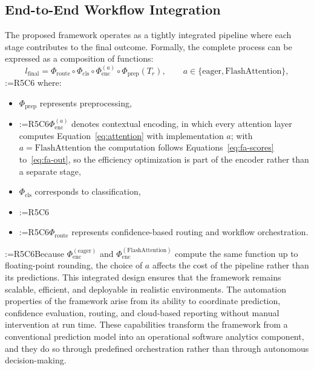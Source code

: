 \documentclass[a4paper,fleqn]{cas-sc}
\makeatletter
\newif\iftracked
\newcommand{\rv@setcolour}[1]{%
  \IfStrEq{#1}{R7C7}{\color{rvEdit}}{%
    \IfSubStr{#1}{R5}{\IfSubStr{#1}{R7}{\color{rvBoth}}{\color{rvFive}}}{\color{rvSeven}}}}
\newcommand{\rv@tag}[1]{\textsuperscript{\sffamily\bfseries\scriptsize[\StrSubstitute{#1}{,}{, }]}\,}
\newcommand{\rv@recordone}[1]{%
  \edef\rv@i{#1}%
  \ifcsdef{rv@n@\rv@i}{}{\csgdef{rv@n@\rv@i}{0}}%
  \csxdef{rv@n@\rv@i}{\the\numexpr\csuse{rv@n@\rv@i}+1\relax}%
  \begingroup\edef\@currentlabel{\rv@i}\label{rv:\rv@i:\csuse{rv@n@\rv@i}}\endgroup}
\newcommand{\rv@record}[1]{\@for\rv@id:=#1\do{\expandafter\rv@recordone\expandafter{\rv@id}}}
\DeclareRobustCommand{\rcdel}[2]{\rv@record{#1}\iftracked{\rv@setcolour{#1}\rv@tag{#1}\rv@strike{#2}}\else\unskip\fi}
\DeclareRobustCommand{\rcrep}[3]{\rv@record{#1}\iftracked{\rv@setcolour{#1}\rv@tag{#1}\rv@strike{#2} #3}\else#3\fi}
\DeclareRobustCommand{\rcm}[2]{\iftracked{\rv@setcolour{#1}#2}\else#2\fi}
\DeclareRobustCommand{\rcnote}[2]{\rv@record{#1}\iftracked{\rv@setcolour{#1}\rv@tag{#1}\textit{[#2]}}\else\unskip\fi}
\makeatother
\begin{document}
\subsection{End-to-End Workflow Integration}
\label{sec:workflow}
The proposed framework operates as a tightly integrated pipeline where each stage contributes to the final outcome. Formally, the complete process can be expressed as a composition of functions:
\begin{equation}
\rcm{R5C6}{l_{\mathrm{final}} = \Phi_{\mathrm{route}} \circ \Phi_{\mathrm{cls}} \circ \Phi_{\mathrm{enc}}^{(a)} \circ \Phi_{\mathrm{prep}}(T_r), \qquad a \in \{\text{eager}, \text{FlashAttention}\},}
\label{eq:composition}
\end{equation}
\rcnote{R5C6}{The previous version of Equation (22) read $l_{\mathrm{final}}=\Phi_{\mathrm{agent}}\circ\Phi_{\mathrm{flash}}\circ\Phi_{\mathrm{cls}}\circ\Phi_{\mathrm{enc}}\circ\Phi_{\mathrm{prep}}(T_r)$, which placed FlashAttention after classification.}
where:
\begin{itemize}
\item $\Phi_{\mathrm{prep}}$ represents preprocessing,
\item \rcrep{R5C6}{$\Phi_{\mathrm{enc}}$ denotes contextual encoding,}{$\Phi_{\mathrm{enc}}^{(a)}$ denotes contextual encoding, in which every attention layer computes Equation~\eqref{eq:attention} with implementation $a$; with $a = \text{FlashAttention}$ the computation follows Equations~\eqref{eq:fa-scores} to~\eqref{eq:fa-out}, so the efficiency optimization is part of the encoder rather than a separate stage,}
\item $\Phi_{\mathrm{cls}}$ corresponds to classification,
\item \rcdel{R5C6}{$\Phi_{\mathrm{flash}}$ applies efficiency optimization,}
\item \rcrep{R5C6}{$\Phi_{\mathrm{agent}}$}{$\Phi_{\mathrm{route}}$} represents confidence-based routing and workflow orchestration.
\end{itemize}
\rcrep{R5C6}{According to Equation (22), the system processes raw input through a sequence of transformations, each enhancing the representation and reliability of predictions.}{Because $\Phi_{\mathrm{enc}}^{(\text{eager})}$ and $\Phi_{\mathrm{enc}}^{(\text{FlashAttention})}$ compute the same function up to floating-point rounding, the choice of $a$ affects the cost of the pipeline rather than its predictions.} This integrated design ensures that the framework remains scalable, efficient, and deployable in realistic environments. The automation properties of the framework arise from its ability to coordinate prediction, confidence evaluation, routing, and cloud-based reporting without manual intervention at run time. These capabilities transform the framework from a conventional prediction model into an operational software analytics component, and they do so through predefined orchestration rather than through autonomous decision-making.
\end{document}
